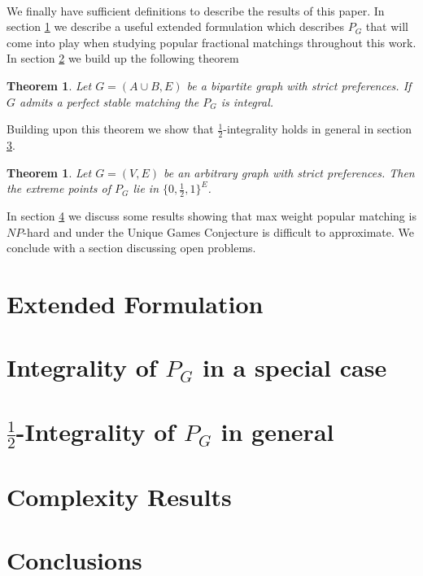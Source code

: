 \documentclass[letterpaper,12pt,oneside,onecolumn]{article}
\newtheorem{theorem}[fact]{Theorem}
\begin{document}
\paragraph{}
We finally have sufficient definitions to describe the results of this paper. In section \ref{sec:formulation} we describe a useful extended formulation which describes $P_G$ that will come into play when studying popular fractional matchings throughout this work. In section \ref{sec:special} we build up the following theorem
\begin{theorem}\label{th:special}
Let $G = (A \cup B, E)$ be a bipartite graph with strict preferences. If $G$ admits a perfect stable matching the $P_G$ is integral.
\end{theorem}
Building upon this theorem we show that $\frac{1}{2}$-integrality holds in general in section \ref{sec:general}.
\begin{theorem}
Let $G=(V,E)$ be an arbitrary graph with strict preferences. Then the extreme points of $P_G$ lie in $\{0,\frac{1}{2}, 1\}^E$.
\end{theorem}
In section \ref{sec:complexity} we discuss some results showing that max weight popular matching is $NP$-hard and under the Unique Games Conjecture is difficult to approximate. We conclude with a section discussing open problems.
\section{Extended Formulation}\label{sec:formulation}

\section{Integrality of $P_G$ in a special case}\label{sec:special}

\section{$\frac{1}{2}$-Integrality of $P_G$ in general}\label{sec:general}

\section{Complexity Results}\label{sec:complexity}

\section{Conclusions}
\end{document}
